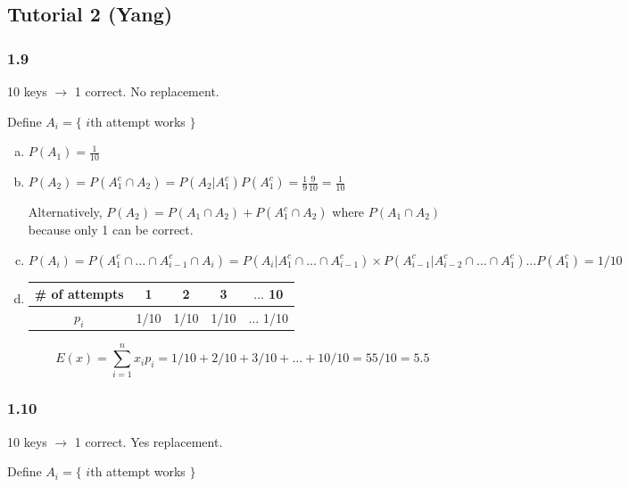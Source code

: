 \documentclass{report}
\begin{document}
\subsection{Tutorial 2 (Yang)}

\subsubsection*{1.9}

10 keys $\rightarrow$ 1 correct. No replacement.

Define $A_i = \{ $ $i$th attempt works $\}$

\begin{enumerate}[(a)]
\item $P(A_1) = \frac{1}{10}$
\item $P(A_2) = P(A_1^c \cap A_2) = P(A_2|A_1^c) P(A_1^c) = \frac{1}{9} \frac{9}{10} = \frac{1}{10}$

Alternatively, $P(A_2) = P(A_1 \cap A_2) + P(A_1^c \cap A_2)$ where $P(A_1 \cap A_2)$ because only 1 can be correct.

\item $P(A_i) = P(A_1^c \cap \dots \cap A_{i-1}^c \cap A_i) = P(A_i | A_1^c \cap \dots \cap A_{i-1}^c) \times P(A_{i-1}^c | A_{i-2}^c \cap \dots \cap A_{1}^c) \dots P(A_1^c) = 1/10$

\item 

\begin{table}[H]
\centering
\begin{tabular}{c|cccc}
\toprule
\# of attempts & 1 & 2 & 3 & $\dots$ 10 \\
\midrule
$p_i$ & 1/10 & 1/10 & 1/10 & $\dots$ 1/10 \\
\bottomrule
\end{tabular}
\end{table}

$$
E(x) = \sum_{i=1}^n x_i p_i = 1/10 + 2/10 + 3/10 + \dots + 10/10 = 55/10 = 5.5
$$



\end{enumerate}

\subsubsection*{1.10}


10 keys $\rightarrow$ 1 correct. Yes replacement.

Define $A_i = \{ $ $i$th attempt works $\}$
\end{document}
